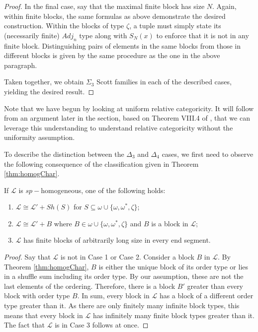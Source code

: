 \documentclass[11pt]{amsart}
\theoremstyle{definition}
\def\L{\mathcal L}
\begin{document}
\begin{proof}
In the final case, say that the maximal finite block has size $N$.
Again, within finite blocks, the same formulas as above demonstrate the desired construction.
Within the blocks of type $\zeta$, a tuple must simply state its (necessarily finite) $Adj_n$ type along with $S_N(x)$ to enforce that it is not in any finite block.
Distinguishing pairs of elements in the same blocks from those in different blocks is given by the same procedure as the one in the above paragraph.

Taken together, we obtain $\Sigma_3$ Scott families in each of the described cases, yielding the desired result. 
\end{proof}

Note that we have begun by looking at uniform relative categoricity.
It will follow from an argument later in the section, based on Theorem VIII.4 of \cite{cst1}, that we can leverage this understanding to understand relative categoricity without the uniformity assumption.

To describe the distinction between the $\Delta_3$ and $\Delta_4$ cases, we first need to observe the following consequence of the classification given in Theorem \ref{thm:homogChar}.

\begin{proposition}\label{prop:CasesDef}
    If $\L$ is $sp-$homogeneous, one of the following holds:
    \begin{enumerate}
        \item $\L\cong\L'+Sh(S)$ for $S\subseteq\omega\cup\{\omega,\omega^*,\zeta\}$;
        \item $\L\cong\L'+B$ where $B\in \omega\cup\{\omega,\omega^*,\zeta\}$ and $B$ is a block in $\L$;
        \item $\L$ has finite blocks of arbitrarily long size in every end segment.
    \end{enumerate}
\end{proposition}

\begin{proof}
    Say that $\L$ is not in Case 1 or Case 2.
    Consider a block $B$ in $\L$.
    By Theorem \ref{thm:homogChar}, $B$ is either the unique block of its order type or lies in a shuffle sum including its order type.
    By our assumption, these are not the last elements of the ordering.
    Therefore, there is a block $B'$ greater than every block with order type $B$.
    In sum, every block in $\L$ has a block of a different order type greater than it.
    As there are only finitely many infinite block types, this means that every block in $\L$ has infinitely many finite block types greater than it.
    The fact that $\L$ is in Case 3 follows at once.
\end{proof}
\end{document}
